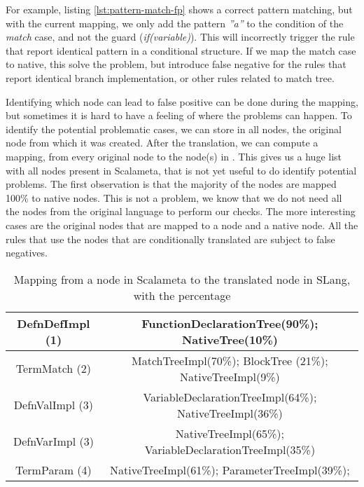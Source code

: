 

For example, listing \ref{lst:pattern-match-fp} shows a correct pattern matching, but with the current mapping, we only add the pattern \emph{”a”} to the condition of the \emph{match} case, and not the guard (\emph{if(variable)}). 
This will incorrectly trigger the rule that report identical pattern in a conditional structure. 
If we map the match case to native, this solve the problem, but introduce false negative for the rules that report identical branch implementation, or other rules related to match tree.

Identifying which node can lead to false positive can be done during the mapping, but sometimes it is hard to have a feeling of where the problems can happen. 
To identify the potential problematic cases, we can store in all nodes, the original node from which it was created. 
After the translation, we can compute a mapping, from every original node to the node(s) in \slang. 
This gives us a huge list with all nodes present in Scalameta, that is not yet useful to do identify potential problems. 
The first observation is that the majority of the nodes are mapped 100\% to native nodes. This is not a problem, we know that we do not need all the nodes from the original language to perform our checks. 
The more interesting cases are the original nodes that are mapped to a \slang node and a native node. 
All the rules that use the nodes that are conditionally translated are subject to false negatives.

\begin{table}[h]
	\centering
	\caption{Mapping from a node in Scalameta to the translated node in SLang, with the percentage}
	\label{table:interesting_mapping}
	\begin{tabular}{|c|c|}
		\hline
		DefnDefImpl (1) &  FunctionDeclarationTree(90\%); NativeTree(10\%) \\ \hline
		TermMatch (2) &  MatchTreeImpl(70\%); BlockTree (21\%); NativeTreeImpl(9\%) \\ \hline
		DefnValImpl (3) &  VariableDeclarationTreeImpl(64\%); NativeTreeImpl(36\%) \\ \hline
		DefnVarImpl (3) & NativeTreeImpl(65\%); VariableDeclarationTreeImpl(35\%) \\ \hline
		TermParam (4) & NativeTreeImpl(61\%); ParameterTreeImpl(39\%); \\ \hline
	\end{tabular}
\end{table}

